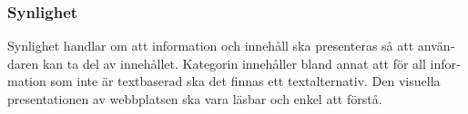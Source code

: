 \documentclass[11p]{article}
\begin{document}
\begin{otherlanguage}{swedish}
    \subsubsection{Synlighet} %
    Synlighet handlar om att information och innehåll ska presenteras så att användaren kan ta del av innehållet.
    Kategorin innehåller bland annat att för all information som inte är textbaserad ska det finnas ett textalternativ.
    Den visuella presentationen av webbplatsen ska vara läsbar och enkel att förstå.

    

\end{otherlanguage}
\end{document}
